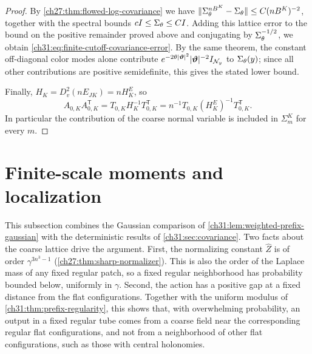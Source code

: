 \begin{proof}
By \cref{ch27:thm:flowed-log-covariance} we have $\lVert \Sigma_\theta^{nB^K}-\Sigma_\theta\rVert\le C(nB^K)^{-2}$, together with the spectral bounds $cI\le\Sigma_\theta\le CI$. Adding this lattice error to the bound on the positive remainder proved above and conjugating by $\Sigma_\theta^{-1/2}$, we obtain \eqref{ch31:eq:finite-cutoff-covariance-error}. By the same theorem, the constant off-diagonal color modes alone contribute $e^{-2\theta\lvert \bm\vartheta\rvert^2}\lvert \bm\vartheta\rvert^{-2}I_{\mathcal N_{y}}$ to $\Sigma_\theta(y)$; since all other contributions are positive semidefinite, this gives the stated lower bound.

Finally, $H_K=D_v^2(nE_{JK})=nH_K^E$, so
\[
 A_{0,K}A_{0,K}^{\mathsf T}=T_{0,K}H_K^{-1}T_{0,K}^{\mathsf T}=n^{-1}T_{0,K}(H_K^E)^{-1}T_{0,K}^{\mathsf T}.
\]
In particular the contribution of the coarse normal variable is included in $\Sigma_m^K$ for every $m$.
\end{proof}

\section{Finite-scale moments and localization}\label{ch31:sec:localization}

This subsection combines the Gaussian comparison of \cref{ch31:lem:weighted-prefix-gaussian} with the deterministic results of \cref{ch31:sec:covariance}. Two facts about the coarse lattice drive the argument. First, the normalizing constant $\widehat Z$ is of order $\gamma^{3n^3-1}$ (\cref{ch27:thm:sharp-normalizer}). This is also the order of the Laplace mass of any fixed regular patch, so a fixed regular neighborhood has probability bounded below, uniformly in $\gamma$. Second, the action has a positive gap at a fixed distance from the flat configurations. Together with the uniform modulus of \cref{ch31:thm:prefix-regularity}, this shows that, with overwhelming probability, an output in a fixed regular tube comes from a coarse field near the corresponding regular flat configurations, and not from a neighborhood of other flat configurations, such as those with central holonomies.


